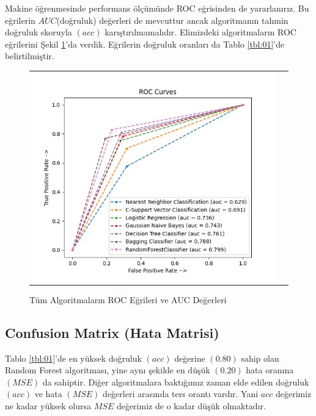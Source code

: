 \documentclass[conference]{IEEEtran}
\begin{document}
\quad Makine öğrenmesinde performans ölçümünde ROC eğrisinden de yararlanırız. Bu eğrilerin $AUC$(doğruluk) değerleri de mevcuttur ancak algoritmanın tahmin doğruluk skoruyla $(acc)$ karıştırılmamalıdır\cite{22}. Elimizdeki algoritmaların ROC eğrilerini Şekil \ref{fig:09}'da verdik. Eğrilerin doğruluk oranları da Tablo \ref{tbl:01}'de belirtilmiştir.

\begin{figure}[!h]
	\centering
	\begin{center}
		\begin{tabular}{cc}
			\includegraphics[scale=0.42]{pictures/pic_09.png}&
		\end{tabular}
	\end{center}
	\caption{Tüm Algoritmaların ROC Eğrileri ve AUC Değerleri}
	\label{fig:09}
\end{figure}

\subsection{\textbf{Confusion Matrix (Hata Matrisi)}}

\quad Tablo \ref{tbl:01}'de en yüksek doğruluk $(acc)$ değerine $(0.80)$ sahip olan Random Forest algoritması, yine aynı şekilde en düşük $(0.20)$ hata oranına $(MSE)$ da sahiptir. Diğer algoritmalara baktığımız zaman elde edilen doğruluk $(acc)$ ve hata $(MSE)$ değerleri arasında ters orantı vardır. Yani $acc$ değerimiz ne kadar yüksek olursa $MSE$ değerimiz de o kadar düşük olmaktadır.
\end{document}

